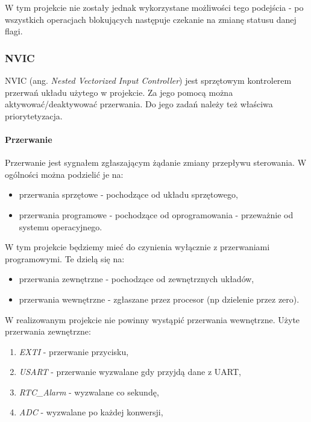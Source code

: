 \documentclass{article}
\begin{document}
W tym projekcie nie zostały jednak wykorzystane możliwości tego podejścia - po wszystkich
operacjach blokujących następuje czekanie na zmianę statusu danej flagi.

\subsubsection{NVIC}
NVIC (ang. \emph{Nested Vectorized Input Controller}) jest sprzętowym kontrolerem
przerwań układu użytego w projekcie. Za jego pomocą można aktywować/deaktywować
przerwania. Do jego zadań należy też właściwa priorytetyzacja.

\paragraph{Przerwanie}
Przerwanie jest sygnałem zgłaszającym żądanie zmiany przepływu sterowania.
W ogólności można podzielić je na:

\begin{itemize}
    \item przerwania sprzętowe - pochodzące od układu sprzętowego,
    \item przerwania programowe - pochodzące od oprogramowania - przeważnie od
            systemu operacyjnego.
\end{itemize}

W tym projekcie będziemy mieć do czynienia wyłącznie z przerwaniami programowymi.
Te dzielą się na:

\begin{itemize}
    \item przerwania zewnętrzne - pochodzące od zewnętrznych układów,
    \item przerwania wewnętrzne - zgłaszane przez procesor (np dzielenie przez zero).
\end{itemize}

W realizowanym projekcie nie powinny wystąpić przerwania wewnętrzne.
Użyte przerwania zewnętrzne:

\begin{enumerate}
    \item \emph{EXTI} - przerwanie przycisku,
    \item \emph{USART} - przerwanie wyzwalane gdy przyjdą dane z UART,
    \item \emph{RTC\_Alarm} - wyzwalane co sekundę,
    \item \emph{ADC} - wyzwalane po każdej konwersji,
\end{enumerate}
\end{document}
